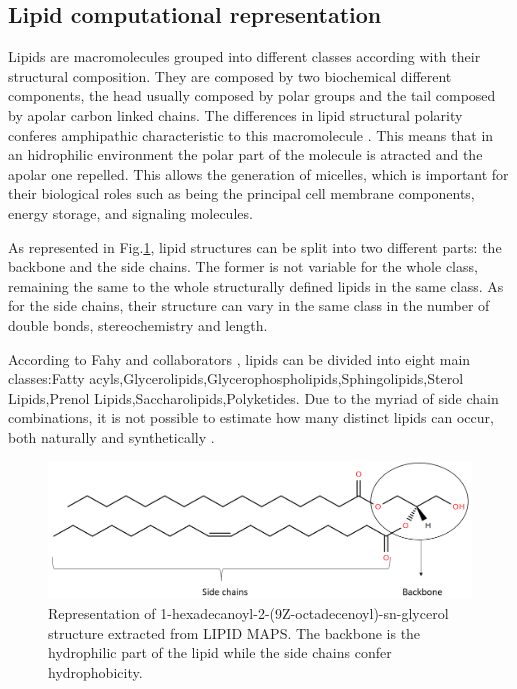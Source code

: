 \documentclass{llncs}
\begin{document}
\subsection{Lipid computational representation}
Lipids are macromolecules grouped into different classes according with their structural composition. 
They are composed by two biochemical different components, the head usually composed by polar groups and the tail composed by apolar carbon linked chains.  
The differences in lipid structural polarity conferes amphipathic characteristic to this macromolecule \cite{Fahy2011}. 
This means that in an hidrophilic environment the polar part of the molecule is atracted and the apolar one repelled.
This allows the generation of micelles, which is important for their biological roles such as being the principal cell membrane components, energy storage, and signaling molecules.

As represented in Fig.\ref{fig1}, lipid structures can be split into two different parts: the backbone and the side chains. The former is not variable for the whole class, remaining the same to the whole structurally defined lipids in the same class.
As for the side chains, their structure can vary in the same class in the number of double bonds, stereochemistry and length.

According to Fahy and collaborators \cite{Fahy2009}, lipids can be divided into eight main classes:Fatty acyls,Glycerolipids,Glycerophospholipids,Sphingolipids,Sterol Lipids,Prenol Lipids,Saccharolipids,Polyketides. 
Due to the myriad of side chain combinations, it is not possible to estimate how many distinct lipids can occur, both naturally and synthetically \cite{Gyamfi2018}.

\begin{figure}
    \includegraphics[width=\textwidth]{imagens/lipido.png}
    \caption{Representation of 1-hexadecanoyl-2-(9Z-octadecenoyl)-sn-glycerol structure extracted from LIPID MAPS. The backbone is the hydrophilic part of the lipid while the side chains confer hydrophobicity.} \label{fig1}
\end{figure}
\end{document}
